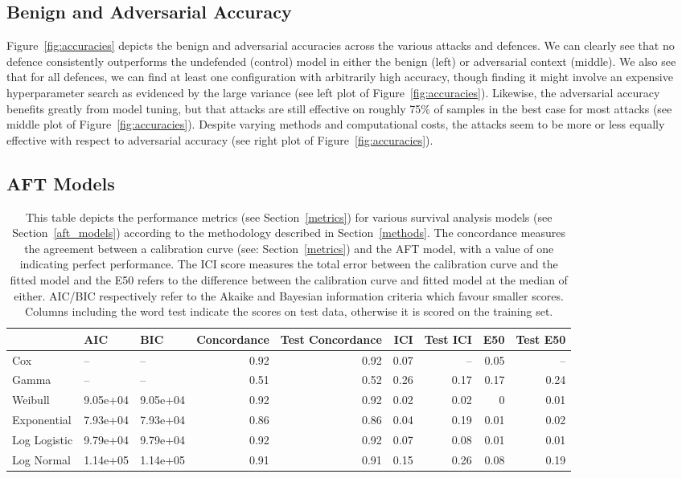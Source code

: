 \subsection{Benign and Adversarial Accuracy}
Figure~\ref{fig:accuracies} depicts the benign and adversarial accuracies across the various attacks and defences. We can clearly see that no defence consistently outperforms the undefended (control) model in either the benign (left) or adversarial context (middle). We also see that for all defences, we can find at least one configuration with arbitrarily high accuracy, though finding it might involve an expensive hyperparameter search as evidenced by the large variance (see left plot of Figure~\ref{fig:accuracies}). Likewise, the adversarial accuracy benefits greatly from model tuning, but that attacks are still effective on roughly 75\% of samples in the best case for most attacks (see middle plot of Figure~\ref{fig:accuracies}). Despite varying methods and computational costs, the attacks seem to be more or less equally effective with respect to adversarial accuracy (see right plot of Figure~\ref{fig:accuracies}).



\subsection{AFT Models}

\begin{table}[!ht]
\centering
\begin{tabular}{lllrrrrrr}
\toprule
 & AIC & BIC & Concordance & Test Concordance & ICI & Test ICI & E50 & Test E50 \\
\midrule
Cox & -- & -- & 0.92 & 0.92 & 0.07 & -- & 0.05 & -- \\
Gamma & -- & -- & 0.51 & 0.52 & 0.26 & 0.17 & 0.17 & 0.24 \\
Weibull & 9.05e+04 & 9.05e+04 & 0.92 & 0.92 & 0.02 & 0.02 & 0 & 0.01 \\
Exponential & 7.93e+04 & 7.93e+04 & 0.86 & 0.86 & 0.04 & 0.19 & 0.01 & 0.02 \\
Log Logistic & 9.79e+04 & 9.79e+04 & 0.92 & 0.92 & 0.07 & 0.08 & 0.01 & 0.01 \\
Log Normal & 1.14e+05 & 1.14e+05 & 0.91 & 0.91 & 0.15 & 0.26 & 0.08 & 0.19 \\
\bottomrule
\end{tabular}
\caption{This table depicts the performance metrics (see Section~\ref{metrics}) for various survival analysis models (see Section~\ref{aft_models}) according to the methodology described in Section~\ref{methods}.  The concordance measures the agreement between a calibration curve
(see: Section~\ref{metrics}) and the AFT model, with a value of one indicating perfect performance. The ICI score measures the total
error between the calibration curve and the fitted model and the E50 refers to the difference between the calibration curve
and fitted model at the median of either. AIC/BIC respectively refer to the Akaike and Bayesian information criteria which
favour smaller scores. Columns including the word test indicate the scores on test data, otherwise it is scored on the training set.}
\label{tab:aft_summary}
\end{table}

